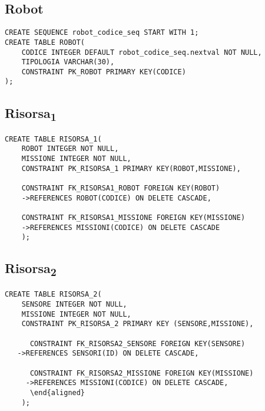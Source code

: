 \begin{description}
\subsection{Robot}
\begin{verbatim}
CREATE SEQUENCE robot_codice_seq START WITH 1;
CREATE TABLE ROBOT(
    CODICE INTEGER DEFAULT robot_codice_seq.nextval NOT NULL,
    TIPOLOGIA VARCHAR(30),
    CONSTRAINT PK_ROBOT PRIMARY KEY(CODICE)
);
\end{verbatim}

\subsection{Risorsa\textsubscript{1}}
\begin{verbatim}
CREATE TABLE RISORSA_1(
    ROBOT INTEGER NOT NULL,
    MISSIONE INTEGER NOT NULL,
    CONSTRAINT PK_RISORSA_1 PRIMARY KEY(ROBOT,MISSIONE),

    CONSTRAINT FK_RISORSA1_ROBOT FOREIGN KEY(ROBOT)
    ->REFERENCES ROBOT(CODICE) ON DELETE CASCADE,
    
    CONSTRAINT FK_RISORSA1_MISSIONE FOREIGN KEY(MISSIONE) 
    ->REFERENCES MISSIONI(CODICE) ON DELETE CASCADE
    );
\end{verbatim}

\subsection{Risorsa\textsubscript{2}}
\begin{verbatim}
CREATE TABLE RISORSA_2(
    SENSORE INTEGER NOT NULL,
    MISSIONE INTEGER NOT NULL,
    CONSTRAINT PK_RISORSA_2 PRIMARY KEY (SENSORE,MISSIONE),
     
      CONSTRAINT FK_RISORSA2_SENSORE FOREIGN KEY(SENSORE)
   ->REFERENCES SENSORI(ID) ON DELETE CASCADE,

      CONSTRAINT FK_RISORSA2_MISSIONE FOREIGN KEY(MISSIONE)
     ->REFERENCES MISSIONI(CODICE) ON DELETE CASCADE,
      \end{aligned}     
    );
\end{verbatim}
\end{description}


